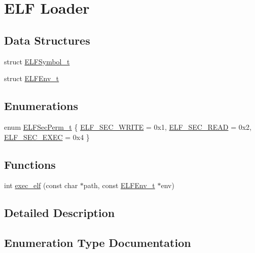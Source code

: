 \hypertarget{group__elf__loader}{}\section{E\+LF Loader}
\label{group__elf__loader}
\subsection*{Data Structures}
\begin{DoxyCompactItemize}
\item 
struct \hyperlink{structELFSymbol__t}{E\+L\+F\+Symbol\+\_\+t}
\item 
struct \hyperlink{structELFEnv__t}{E\+L\+F\+Env\+\_\+t}
\end{DoxyCompactItemize}
\subsection*{Enumerations}
\begin{DoxyCompactItemize}
\item 
enum \hyperlink{group__elf__loader_ga9bec475ce684483bfe2b60164d65841b}{E\+L\+F\+Sec\+Perm\+\_\+t} \{ \hyperlink{group__elf__loader_gga9bec475ce684483bfe2b60164d65841ba9637ca527cb9efa81de0a9dd689c5aec}{E\+L\+F\+\_\+\+S\+E\+C\+\_\+\+W\+R\+I\+TE} = 0x1, 
\hyperlink{group__elf__loader_gga9bec475ce684483bfe2b60164d65841ba375943d76c76954351ca62462e213dc6}{E\+L\+F\+\_\+\+S\+E\+C\+\_\+\+R\+E\+AD} = 0x2, 
\hyperlink{group__elf__loader_gga9bec475ce684483bfe2b60164d65841ba3f3ea7773c3231ffc68025b9eb9e4701}{E\+L\+F\+\_\+\+S\+E\+C\+\_\+\+E\+X\+EC} = 0x4
 \}
\end{DoxyCompactItemize}
\subsection*{Functions}
\begin{DoxyCompactItemize}
\item 
int \hyperlink{group__elf__loader_ga1de52b2875f44a9365a1b8e266eb6e73}{exec\+\_\+elf} (const char $\ast$path, const \hyperlink{structELFEnv__t}{E\+L\+F\+Env\+\_\+t} $\ast$env)
\end{DoxyCompactItemize}


\subsection{Detailed Description}


\subsection{Enumeration Type Documentation}
